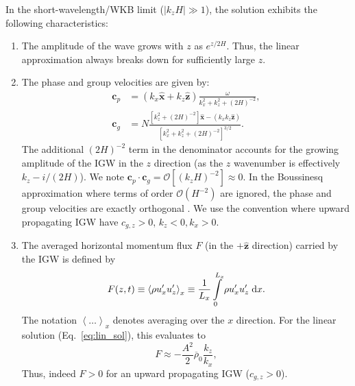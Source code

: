 \documentclass[
        fleqn,
        usenatbib,
    ]{mnras}
\newcommand*{\abs}[1]{\left|#1\right|}
\newcommand*{\ev}[1]{\left\langle#1\right\rangle}
\newcommand*{\p}[1]{\left(#1\right)}
\newcommand*{\s}[1]{\left[#1\right]}
\newcommand*{\bm}[1]{\mathbf{#1}}
\newcommand*{\uv}[1]{\hat{\mathbf{#1}}}
\begin{document}
In the short-wavelength/WKB limit ($\abs{k_{z}H} \gg 1$), the solution exhibits
the following characteristics:
\begin{enumerate}
    \item The amplitude of the wave grows with $z$ as $e^{z/2H}$. Thus, the
        linear approximation always breaks down for sufficiently large $z$.

    \item The phase and group velocities are given by:
        \begin{align}
            \bm{c}_{p} &=
                \p{k_{x}\uv{x} + k_{z}\uv{z}}\frac{\omega}
                {k_{x}^2 + k_{z}^2 + \p{2H}^{-2}},\\
            \bm{c}_{g} &= N\frac{\s{k_{z}^2 + \p{2H}^{-2}}\uv{x}
                - \p{k_{x}k_{z}\uv{z}}}
                {\s{k_{x}^2 + k_{z}^2 + \p{2H}^{-2}}^{3/2}}.\label{eq:vg}
        \end{align}
        The additional $\p{2H}^{-2}$ term in the denominator
        accounts for the growing amplitude of the IGW in the $z$ direction (as
        the $z$ wavenumber is effectively $k_z - i / (2H)$). We note
        $\bm{c}_{p} \cdot \bm{c}_g = \mathcal{O}\s{\p{k_{z}H}^{-2}} \approx 0$.
        In the Boussinesq approximation where terms of order
        $\mathcal{O}\p{H^{-2}}$ are ignored, the phase and group velocities are
        exactly orthogonal \citep{drazin,sutherland1}. We use the convention
        where upward propagating IGW have $c_{g, z} > 0$, $k_z < 0, k_x > 0$.

    \item The averaged horizontal momentum flux $F$ (in the $+\uv{z}$
        direction) carried by the IGW is defined by
        \begin{equation}
            F(z, t) \equiv \ev{\rho u_{x}' u_{z}'}_x \equiv
                \frac{1}{L_x}\int_0^{L_x}\limits \rho u_{x}'u_{z}'\;\mathrm{d}x.
                    \label{eq:F_def}
        \end{equation}
        The notation $\ev{\dots}_x$ denotes averaging over the $x$ direction.
        For the linear solution (Eq.~\ref{eq:lin_sol}), this evaluates to
        \begin{equation}
            F \approx -\frac{A^2}{2}\overline{\rho}_0\frac{k_{z}}{k_{x}},
                    \label{eq:S_lin}
        \end{equation}
        Thus, indeed $F > 0$ for an upward propagating IGW ($c_{g, z} > 0$).
\end{enumerate}
\end{document}
